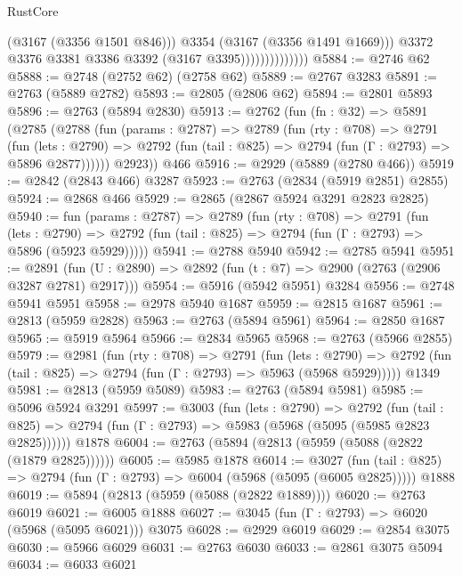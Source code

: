 \begin{lexlean}{RustCore}
\begin{coremodule}
                                  (@3167 (@3356 @1501 @846)))
                                @3354
                                (@3167 (@3356 @1491 @1669)))
                              @3372
                              @3376
                              @3381
                              @3386
                              @3392
                              (@3167 @3395))))))))))))))
@5884 := @2746 @62
@5888 := @2748 (@2752 @62) (@2758 @62)
@5889 := @2767 @3283
@5891 := @2763 (@5889 @2782)
@5893 := @2805 (@2806 @62)
@5894 := @2801 @5893
@5896 := @2763 (@5894 @2830)
@5913 := @2762
    (fun (fn : @32) =>
    @5891
      (@2785
        (@2788
          (fun (params : @2787) =>
          @2789
            (fun (rty : @708) =>
            @2791
              (fun (lets : @2790) =>
              @2792 (fun (tail : @825) => @2794 (fun (Γ : @2793) => @5896 @2877))))))
        @2923))
    @466
@5916 := @2929 (@5889 (@2780 @466))
@5919 := @2842 (@2843 @466) @3287
@5923 := @2763 (@2834 (@5919 @2851) @2855)
@5924 := @2868 @466
@5929 := @2865 (@2867 @5924 @3291 @2823 @2825)
@5940 := fun (params : @2787) =>
  @2789
    (fun (rty : @708) =>
    @2791
      (fun (lets : @2790) =>
      @2792 (fun (tail : @825) => @2794 (fun (Γ : @2793) => @5896 (@5923 @5929)))))
@5941 := @2788 @5940
@5942 := @2785 @5941
@5951 := @2891 (fun (U : @2890) => @2892 (fun (t : @7) => @2900 (@2763 (@2906 @3287 @2781) @2917)))
@5954 := @5916 (@5942 @5951) @3284
@5956 := @2748 @5941 @5951
@5958 := @2978 @5940 @1687
@5959 := @2815 @1687
@5961 := @2813 (@5959 @2828)
@5963 := @2763 (@5894 @5961)
@5964 := @2850 @1687
@5965 := @5919 @5964
@5966 := @2834 @5965
@5968 := @2763 (@5966 @2855)
@5979 := @2981
    (fun (rty : @708) =>
    @2791
      (fun (lets : @2790) =>
      @2792 (fun (tail : @825) => @2794 (fun (Γ : @2793) => @5963 (@5968 @5929)))))
    @1349
@5981 := @2813 (@5959 @5089)
@5983 := @2763 (@5894 @5981)
@5985 := @5096 @5924 @3291
@5997 := @3003
    (fun (lets : @2790) =>
    @2792
      (fun (tail : @825) => @2794 (fun (Γ : @2793) => @5983 (@5968 (@5095 (@5985 @2823 @2825))))))
    @1878
@6004 := @2763 (@5894 (@2813 (@5959 (@5088 (@2822 (@1879 @2825))))))
@6005 := @5985 @1878
@6014 := @3027
    (fun (tail : @825) => @2794 (fun (Γ : @2793) => @6004 (@5968 (@5095 (@6005 @2825)))))
    @1888
@6019 := @5894 (@2813 (@5959 (@5088 (@2822 @1889))))
@6020 := @2763 @6019
@6021 := @6005 @1888
@6027 := @3045 (fun (Γ : @2793) => @6020 (@5968 (@5095 @6021))) @3075
@6028 := @2929 @6019
@6029 := @2854 @3075
@6030 := @5966 @6029
@6031 := @2763 @6030
@6033 := @2861 @3075 @5094
@6034 := @6033 @6021

\end{coremodule}
\end{lexlean}
